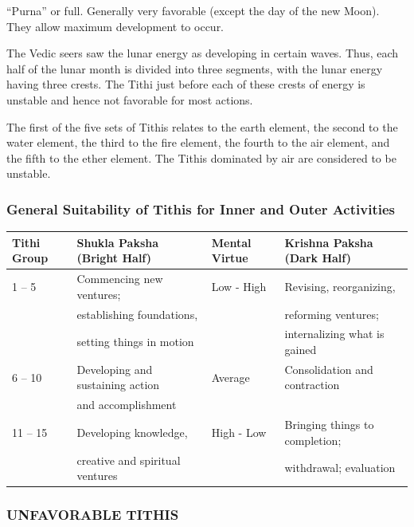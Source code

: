  “Purna” or full. Generally very favorable (except the day of the new Moon). They allow maximum development to occur.
 

The Vedic seers saw the lunar energy as developing in certain waves. Thus, each half of the lunar month is divided into three segments, with the lunar energy having three crests. The Tithi just before each of these crests of energy is unstable and hence not favorable for most actions.

 

The first of the five sets of Tithis relates to the earth element, the second to the water element, the third to the fire element, the fourth to the air element, and the fifth to the ether element. The Tithis dominated by air are considered to be unstable.

 

\subsubsection{General Suitability of Tithis for Inner and Outer Activities}

 
\begin{center}
\begin{tabular}{ l l l l}

Tithi  Group	&Shukla  Paksha (Bright  Half) &Mental  Virtue	&Krishna  Paksha  (Dark  Half) \\
\hline
1 –  5	&Commencing new ventures; 	 &Low    -     High	&Revising, reorganizing, \\
                 & establishing foundations, & & reforming ventures; \\
                 &setting things in motion     & & internalizing what is gained \\
6 – 10	&Developing and sustaining action 	&Average	&Consolidation and contraction  \\
                 & and accomplishment & & \\
11 – 15	&Developing knowledge, &High   -    Low	&Bringing things to completion; \\
                 & creative and spiritual ventures  & & withdrawal; evaluation \\
\end{tabular}
\end{center}
 

\subsubsection{UNFAVORABLE TITHIS}

